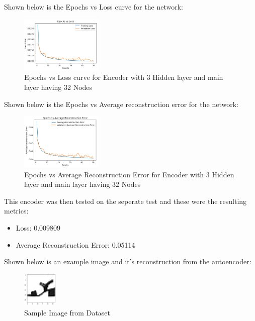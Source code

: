 \documentclass[conference]{IEEEtran}
\begin{document}
    Shown below is the Epochs vs Loss curve for the network:

    \begin{figure}[H]
        \centering
        \captionsetup{justification=centering}
        \centering
            \includegraphics[width=0.35\textwidth]{13.png}
            \caption{Epochs vs Loss curve for Encoder with 3 Hidden layer and main layer having 32 Nodes}
    \end{figure}

    Shown below is the Epochs vs Average reconstruction error for the network:

    \begin{figure}[H]
        \centering
        \captionsetup{justification=centering}
        \centering
            \includegraphics[width=0.35\textwidth]{14.png}
            \caption{Epochs vs Average Reconstruction Error for Encoder with 3 Hidden layer and main layer having 32 Nodes}
    \end{figure}

    This encoder was then tested on the seperate test and these were the resulting metrics:

    \begin{itemize}
        \item Loss: 0.009809
        \item Average Reconstruction Error: 0.05114\\
    \end{itemize}

    Shown below is an example image and it's reconstruction from the autoencoder:

    \begin{figure}[H]
        \centering
        \captionsetup{justification=centering}
        \centering
            \includegraphics[width=0.15\textwidth]{15.png}
            \caption{Sample Image from Dataset}
    \end{figure}
\end{document}
